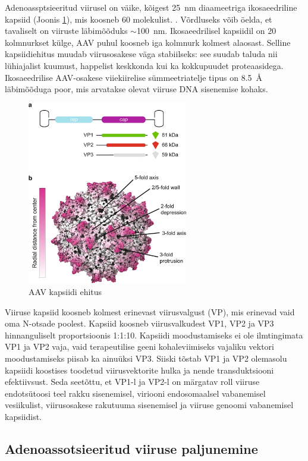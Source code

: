 \documentclass{trkut}%
\begin{document}
Adenoassptsieeritud viirusel on väike, kõigest \SI{25}{\nano\metre} diaameetriga ikosaeedriline kapsiid (Joonis \ref{aavkapsiid}), mis koosneb 60 molekulist. \parencite{samulski}. Võrdluseks võib öelda, et tavaliselt on viiruste läbimõõduks $\sim$\SI{100}{\nano\metre}. Ikosaeedrilisel kapsiidil on 20 kolmnurkset külge, AAV puhul koosneb iga kolmnurk kolmest alaosast. \parencite{viirusüld} Selline kapsiidiehitus muudab viirusosakese väga stabiilseks: see suudab taluda nii lühiajalist kuumust, happelist keskkonda kui ka kokkupuudet proteaasidega. Ikosaeedrilise AAV-osakese viiekiirelise sümmeetriatelje tipus on \SI{8,5}{\angstrom} läbimõõduga poor, mis arvatakse olevat viiruse DNA sisenemise kohaks. \parencite{samulski}

\begin{figure}[htbp]
	\includegraphics[width=7cm]{kapsiid.png}
	\caption{AAV kapsiidi ehitus}
	\label{aavkapsiid}
\end{figure}

Viiruse kapsiid koosneb kolmest erinevast viirusvalgust (VP), mis erinevad vaid oma N-otsade poolest. Kapsiid koosneb viirusvalkudest VP1, VP2 ja VP3 hinnanguliselt proportsioonis 1:1:10. Kapsiidi moodustamiseks ei ole ilmtingimata VP1 ja VP2 vaja, vaid terapeutilise geeni kohaleviimiseks vajaliku vektori moodustamiseks piisab ka ainuüksi VP3. Siiski tõstab VP1 ja VP2 olemasolu kapsiidi koostises toodetud viirusvektorite hulka ja nende transduktsiooni efektiivsust. Seda seetõttu, et VP1-l ja VP2-l on märgatav roll viiruse endotsütoosi teel rakku sisenemisel, viriooni endosomaalsel vabanemisel vesiikulist, viirusosakese rakutuuma sisenemisel ja viiruse genoomi vabanemisel kapsiidist. \parencite{nature_aav} 

\subsection{Adenoassotsieeritud viiruse paljunemine}
\end{document}
